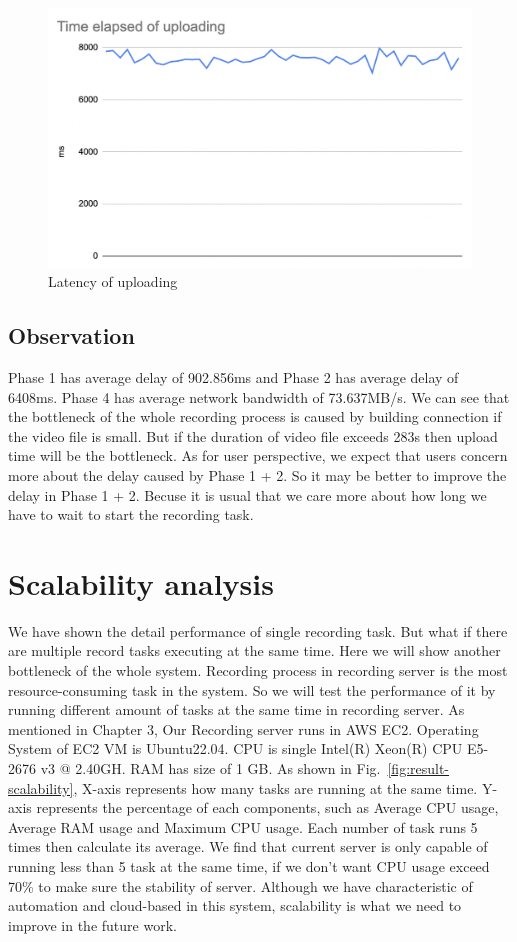 \begin{figure}[H]
    \centering
    \includegraphics[width=\textwidth]{figsrc/result-p4-1.png}
    \caption{Latency of uploading\label{fig:result-p4-1}}
\end{figure}

\subsection{Observation}
Phase 1 has average delay of 902.856ms and Phase 2 has average delay of 6408ms. Phase 4 has average network bandwidth of 73.637MB/s. We can see that the bottleneck of the whole recording process is caused by building connection if the video file is small. But if the duration of video file exceeds 283s then upload time will be the bottleneck. As for user perspective, we expect that users concern more about the delay caused by Phase 1 + 2. So it may be better to improve the delay in Phase 1 + 2. Becuse it is usual that we care more about how long we have to wait to start the recording task.

\section{Scalability analysis}
We have shown the detail performance of single recording task. But what if there are multiple record tasks executing at the same time. Here we will show another bottleneck of the whole system. Recording process in recording server is the most resource-consuming task in the system. So we will test the performance of it by running different amount of tasks at the same time in recording server. As mentioned in Chapter 3, Our Recording server runs in AWS EC2. Operating System of EC2 VM is Ubuntu22.04. CPU is single Intel(R) Xeon(R) CPU E5-2676 v3 @ 2.40GH. RAM has size of 1 GB. As shown in Fig.~\ref{fig:result-scalability}, X-axis represents how many tasks are running at the same time. Y-axis represents the percentage of each components, such as Average CPU usage, Average RAM usage and Maximum CPU usage. Each number of task runs 5 times then calculate its average. We find that current server is only capable of running less than 5 task at the same time, if we don't want CPU usage exceed 70\% to make sure the stability of server. Although we have characteristic of automation and cloud-based in this system, scalability is what we need to improve in the future work.

